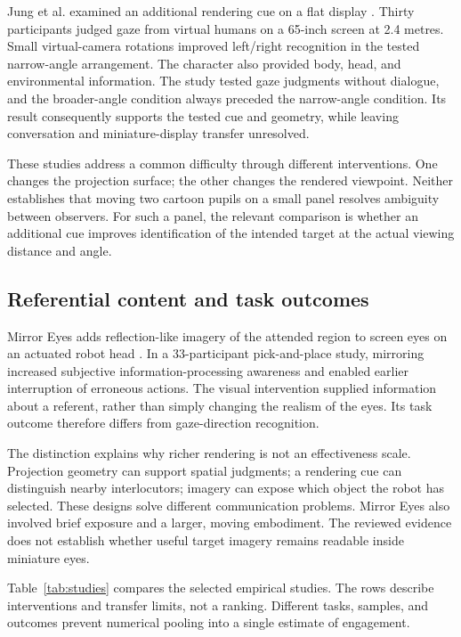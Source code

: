 \documentclass[journal]{IEEEtran}
\begin{document}
Jung et al. examined an additional rendering cue on a flat display \cite{jung2023}. Thirty participants judged gaze from virtual humans on a 65-inch screen at 2.4 metres. Small virtual-camera rotations improved left/right recognition in the tested narrow-angle arrangement. The character also provided body, head, and environmental information. The study tested gaze judgments without dialogue, and the broader-angle condition always preceded the narrow-angle condition. Its result consequently supports the tested cue and geometry, while leaving conversation and miniature-display transfer unresolved.

These studies address a common difficulty through different interventions. One changes the projection surface; the other changes the rendered viewpoint. Neither establishes that moving two cartoon pupils on a small panel resolves ambiguity between observers. For such a panel, the relevant comparison is whether an additional cue improves identification of the intended target at the actual viewing distance and angle.

\subsection{Referential content and task outcomes}
Mirror Eyes adds reflection-like imagery of the attended region to screen eyes on an actuated robot head \cite{mirror2025}. In a 33-participant pick-and-place study, mirroring increased subjective information-processing awareness and enabled earlier interruption of erroneous actions. The visual intervention supplied information about a referent, rather than simply changing the realism of the eyes. Its task outcome therefore differs from gaze-direction recognition.

The distinction explains why richer rendering is not an effectiveness scale. Projection geometry can support spatial judgments; a rendering cue can distinguish nearby interlocutors; imagery can expose which object the robot has selected. These designs solve different communication problems. Mirror Eyes also involved brief exposure and a larger, moving embodiment. The reviewed evidence does not establish whether useful target imagery remains readable inside miniature eyes.

Table~\ref{tab:studies} compares the selected empirical studies. The rows describe interventions and transfer limits, not a ranking. Different tasks, samples, and outcomes prevent numerical pooling into a single estimate of engagement.
\end{document}
